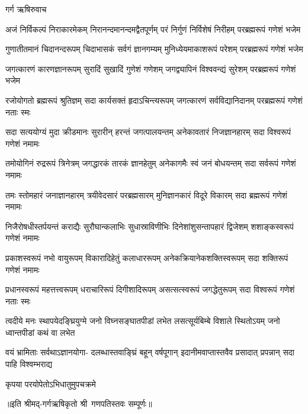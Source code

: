
गर्ग ऋषिरुवाच

\fourlineindentedshloka
{अजं निर्विकल्पं निराकारमेकम्}
{निरानन्दमानन्दमद्वैतपूर्णम्}
{परं निर्गुणं निर्विशेषं निरीहम्}
{परब्रह्मरूपं गणेशं भजेम}%

\fourlineindentedshloka
{गुणातीतमानं चिदानन्दरूपम्}
{चिदाभासकं सर्वगं ज्ञानगम्यम्}
{मुनिध्येयमाकाशरूपं परेशम्}
{परब्रह्मरूपं गणेशं भजेम}%

\fourlineindentedshloka
{जगत्कारणं कारणज्ञानरूपम्}
{सुरादिं सुखादिं गुणेशं गणेशम्}
{जगद्व्यापिनं विश्ववन्द्यं सुरेशम्}
{परब्रह्मरूपं गणेशं भजेम}%

\fourlineindentedshloka
{रजोयोगतो ब्रह्मरूपं श्रुतिज्ञम्}
{सदा कार्यसक्तं हृदाऽचिन्त्यरूपम्}
{जगत्कारणं सर्वविद्यानिदानम्}
{परब्रह्मरूपं गणेशं नताः स्मः}%

\fourlineindentedshloka
{सदा सत्ययोग्यं मुदा क्रीडमानः}
{सुरारीन् हरन्तं जगत्पालयन्तम्}
{अनेकावतारं निजज्ञानहारम्}
{सदा विश्वरूपं गणेशं नमामः}%


\fourlineindentedshloka
{तमोयोगिनं रुद्ररूपं त्रिनेत्रम्}
{जगद्धारकं तारकं ज्ञानहेतुम्}
{अनेकागमैः स्वं जनं बोधयन्तम्}
{सदा सर्वरूपं गणेशं नमामः}%

\fourlineindentedshloka
{तमः स्तोमहारं जनाज्ञानहारम्}
{त्रयीवेदसारं परब्रह्मसारम्}
{मुनिज्ञानकारं विदूरे विकारम्}
{सदा ब्रह्मरूपं गणेशं नमामः}%

\fourlineindentedshloka
{निजैरोषधीस्तर्पयन्तं कराद्यैः}
{सुरौघान्कलाभिः सुधास्राविणीभिः}
{दिनेशांशुसन्तापहारं द्विजेशम्}
{शशाङ्कस्वरूपं गणेशं नमामः}%

\fourlineindentedshloka
{प्रकाशस्वरूपं नभो वायुरूपम्}
{विकारादिहेतुं कलाधाररूपम्}
{अनेकक्रियानेकशक्तिस्वरूपम्}
{सदा शक्तिरूपं गणेशं नमामः}%

\fourlineindentedshloka
{प्रधानस्वरूपं महत्तत्त्वरूपम्}
{धराचारिरूपं दिगीशादिरूपम्}
{असत्सत्स्वरूपं जगद्धेतुरूपम्}
{सदा विश्वरूपं गणेशं नताः स्मः}%

\fourlineindentedshloka
{त्वदीये मनः स्थापयेदङ्घ्रियुग्मे}
{जनो विघ्नसङ्घातपीडां लभेत}
{लसत्सूर्यबिम्बे विशाले स्थितोऽयम्}
{जनो ध्वान्तपीडां कथं वा लभेत}%

\fourlineindentedshloka
{वयं भ्रामिताः सर्वथाऽज्ञानयोगा-}
{दलब्धास्तवाङ्घ्रिं बहून् वर्षपूगान्}
{इदानीमवाप्तास्तवैव प्रसादात्}
{प्रपन्नान् सदा पाहि विश्वम्भराद्य}%

{कृपया परयोपेतोऽभिधातुमुपचक्रमे}%

॥इति श्रीमद्-गर्गऋषिकृतो श्री~गणपतिस्तवः सम्पूर्णः॥

